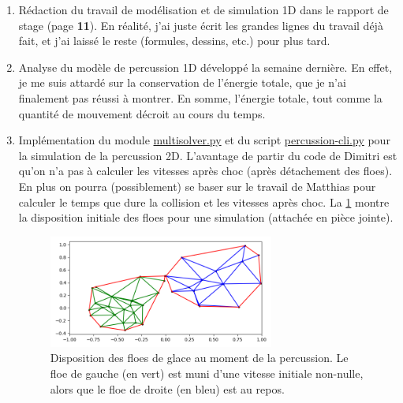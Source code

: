 \documentclass[
  french,
	11pt, %
]{fphw}
\begin{document}
\begin{enumerate}
  \item Rédaction du travail de modélisation et de simulation 1D dans le rapport de stage (page \textbf{11}). En réalité, j'ai juste écrit les grandes lignes du travail déjà fait, et j'ai laissé le reste (formules, dessins, etc.) pour plus tard.
  \item Analyse du modèle de percussion 1D développé la semaine dernière. En effet, je me suis attardé sur la conservation de l'énergie totale, que je n'ai finalement pas réussi à montrer. En somme, l'énergie totale, tout comme la quantité de mouvement décroit au cours du temps.
  \item Implémentation du module \href{https://framagit.org/RaK/SimuRessorts/-/blob/master/springslattice/multisolver.py}{multisolver.py} et du script \href{https://framagit.org/RaK/SimuRessorts/-/blob/master/percussion-cli.py}{percussion-cli.py} pour la simulation de la percussion 2D. L'avantage de partir du code de Dimitri est qu'on n'a pas à calculer les vitesses après choc (après détachement des floes). En plus on pourra (possiblement) se baser sur le travail de Matthias pour calculer le temps que dure la collision et les vitesses après choc. La \cref{fig:myfig} montre la disposition initiale des floes pour une simulation (attachée en pièce jointe).
  \begin{figure}[H]
    \centering
    \includegraphics[width=0.70\textwidth]{Percussion2D.png}
    \caption{Disposition des floes de glace au moment de la percussion. Le floe de gauche (en vert) est muni d'une vitesse initiale non-nulle, alors que le floe de droite (en bleu) est au repos.}
    \label{fig:myfig}
  \end{figure}
\end{enumerate}


 
\end{document}
